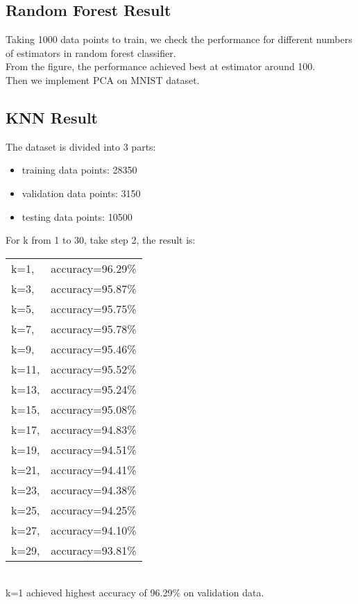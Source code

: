 \documentclass{article}
\begin{document}
\subsection{Random Forest Result}
Taking 1000 data points to train, we check the performance for different numbers of estimators in random forest classifier.\\
From the figure, the performance achieved best at estimator around 100.\\


Then we implement PCA on MNIST dataset.\\





\subsection{KNN Result}
The dataset is divided into 3 parts:
\begin{itemize}
\item training data points: 28350
\item validation data points: 3150
\item testing data points: 10500
\end{itemize}

For k from 1 to 30, take step 2, the result is:\\
\begin{tabular}{lr}
k=1, &accuracy=96.29\%\\
k=3, &accuracy=95.87\%\\
k=5, &accuracy=95.75\%\\
k=7, &accuracy=95.78\%\\
k=9, &accuracy=95.46\%\\
k=11,&accuracy=95.52\%\\
k=13, &accuracy=95.24\%\\
k=15, &accuracy=95.08\%\\
k=17, &accuracy=94.83\%\\
k=19, &accuracy=94.51\%\\
k=21, &accuracy=94.41\%\\
k=23, &accuracy=94.38\%\\
k=25, &accuracy=94.25\%\\
k=27, &accuracy=94.10\%\\
k=29, &accuracy=93.81\%
\end{tabular}\\
k=1 achieved highest accuracy of 96.29\% on validation data.\\
\end{document}
